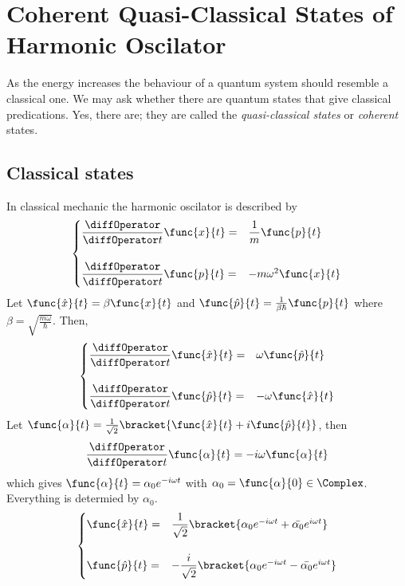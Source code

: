 \chapter{Coherent Quasi-Classical States of Harmonic Oscilator}
As the energy increases the behaviour of a quantum system should resemble a classical one. We may ask whether there are quantum states that give classical predications. Yes, there are; they are called the \textit{quasi-classical states} or \textit{coherent} states.
\section{Classical states}
In classical mechanic the harmonic oscilator is described by 
\begin{equation*}
    \begin{cases}
        \dfrac{\diffOperator}{\diffOperator t} \func{x}{t} =& \dfrac{1}{m} \func{p}{t}\\
        & \\
        \dfrac{\diffOperator}{\diffOperator t} \func{p}{t} =& -m\omega^2 \func{x}{t}
    \end{cases}
\end{equation*}
Let \(\func{\hat{x}}{t} = \beta \func{x}{t}\) and \(\func{\hat{p}}{t} = \frac{1}{\beta \hbar} \func{p}{t}\) where \(\beta = \sqrt{\frac{m\omega}{\hbar}}\). Then,
\begin{equation*}
    \begin{cases}
        \dfrac{\diffOperator}{\diffOperator t} \func{\hat{x}}{t} =& \omega \func{\hat{p}}{t}\\
        & \\
        \dfrac{\diffOperator}{\diffOperator t} \func{\hat{p}}{t} =& -\omega \func{\hat{x}}{t}
    \end{cases}
\end{equation*}
Let \(\func{\alpha}{t} = \frac{1}{\sqrt{2}} \bracket{\func{\hat{x}}{t} + i \func{\hat{p}}{t}}\), then 
\begin{equation*}
        \dfrac{\diffOperator}{\diffOperator t} \func{\alpha}{t} = -i\omega \func{\alpha}{t}
\end{equation*}
which gives \(\func{\alpha}{t} = \alpha_0 e^{-i\omega t}\) with \(\alpha_0 =\func{\alpha}{0} \in \Complex\). Everything is determied by \(\alpha_0\).
\begin{equation*}
    \begin{cases}
        \func{\hat{x}}{t} =& \dfrac{1}{\sqrt{2}} \bracket{\alpha_0 e^{-i\omega t} + \bar{\alpha_0} e^{i\omega t}}\\
        & \\
        \func{\hat{p}}{t} =& -\dfrac{i}{\sqrt{2}} \bracket{\alpha_0 e^{-i\omega t} - \bar{\alpha_0} e^{i\omega t}}
    \end{cases}
\end{equation*}
